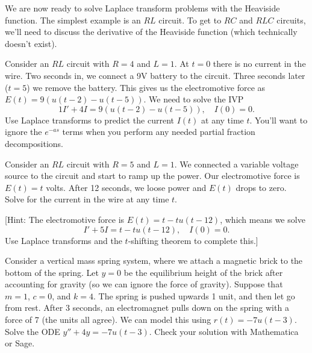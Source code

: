 We are now ready to solve Laplace transform problems with the Heaviside function.  The simplest example is an $RL$ circuit.  To get to $RC$ and $RLC$ circuits, we'll need to discuss the derivative of the Heaviside function (which technically doesn't exist).

\begin{problem}
 Consider an $RL$ circuit with $R=4$ and $L=1$. At $t=0$ there is no current in the wire.  Two seconds in, we connect a 9V battery to the circuit.  Three seconds later ($t=5$) we remove the battery.  This gives us the electromotive force as $E(t) = 9(u(t-2)-u(t-5))$.  We need to solve the IVP
$$1I'+4I=9(u(t-2)-u(t-5)), \quad I(0)=0.$$
Use Laplace transforms to predict the current $I(t)$ at any time $t$. You'll want to ignore the $e^{-as}$ terms when you perform any needed partial fraction decompositions.
\end{problem}

\begin{problem}
 Consider an $RL$ circuit with $R=5$ and $L=1$. We connected a variable voltage source to the circuit and start to ramp up the power.  Our electromotive force is $E(t)=t$ volts. After 12 seconds, we loose power and $E(t)$ drops to zero. Solve for the current in the wire at any time $t$.

[Hint: The electromotive force is $E(t) = t - tu(t-12)$, which means we solve
$$I'+5I=t - tu(t-12), \quad I(0)=0.$$
Use Laplace transforms and the $t$-shifting theorem to complete this.]
\end{problem}


\begin{problem}
 Consider a vertical mass spring system, where we attach a magnetic brick to the bottom of the spring. Let $y=0$ be the equilibrium height of the brick after accounting for gravity (so we can ignore the force of gravity). 
Suppose that $m = 1$, $c = 0$, and $k=4$. The spring is pushed upwards 1 unit, and then let go from rest. After 3 seconds, an electromagnet pulls down on the spring with a force of 7 (the units all agree). We can model this using $r(t)=-7u(t-3)$.  Solve the ODE $y''+4y=-7u(t-3)$. Check your solution with Mathematica or Sage. 
\end{problem}

